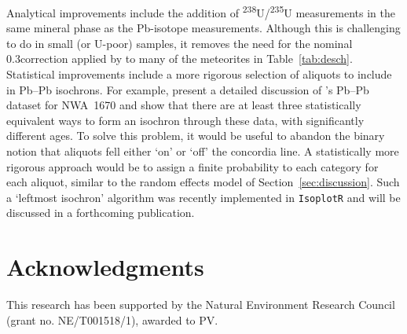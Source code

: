 \documentclass{article}
\begin{document}
Analytical improvements include the addition of
\textsuperscript{238}U/\textsuperscript{235}U measurements in the same
mineral phase as the Pb-isotope measurements. Although this is
challenging to do in small (or U-poor) samples, it removes the need
for the nominal 0.3\textperthousand correction applied by
\citet{desch2023a,desch2023b} to many of the meteorites in
Table~\ref{tab:desch}. Statistical improvements include a more
rigorous selection of aliquots to include in Pb--Pb isochrons.  For
example, \citet{desch2023a} present a detailed discussion of
\citet{schiller2015}'s Pb--Pb dataset for NWA~1670 and show that there
are at least three statistically equivalent ways to form an isochron
through these data, with significantly different ages. To solve this
problem, it would be useful to abandon the binary notion that aliquots
fell either `on' or `off' the concordia line. A statistically more
rigorous approach would be to assign a finite probability to each
category for each aliquot, similar to the random effects model of
Section~\ref{sec:discussion}. Such a `leftmost isochron' algorithm was
recently implemented in \texttt{IsoplotR} \citep{vermeesch2018c} and
will be discussed in a forthcoming publication.

\section*{Acknowledgments}

This research has been supported by the Natural Environment Research
Council (grant no. NE/T001518/1), awarded to PV.
\end{document}
